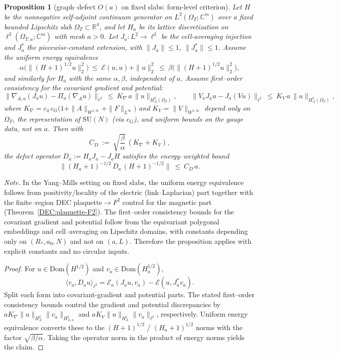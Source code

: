 \documentclass[11pt]{amsart}
\theoremstyle{plain}
\newtheorem{proposition}[theorem]{Proposition}
\theoremstyle{definition}
\theoremstyle{remark}
\renewcommand{\tfrac}[2]{\textstyle\frac{#1}{#2}}
\begin{document}
\begin{proposition}[graph--defect $O(a)$ on fixed slabs: form-level criterion]\label{lem:graph-defect-Oa}
Let $H$ be the nonnegative self-adjoint continuum generator on $L^2(\Omega_T;\mathbb{C}^m)$ over a fixed bounded Lipschitz slab $\Omega_T\subset\mathbb{R}^4$, and let $H_a$ be its lattice discretization on $\ell^2(\Omega_{T,a};\mathbb{C}^m)$ with mesh $a>0$. Let $J_a:L^2\to\ell^2$ be the cell-averaging injection and $J_a^*$ the piecewise-constant extension, with $\|J_a\|\le 1$, $\|J_a^*\|\le 1$. Assume the uniform energy equivalence
\[
\alpha\big(\|(H+1)^{1/2}u\|_2^2\big)\ \le\ \mathcal{E}(u,u)+\|u\|_2^2\ \le\ \beta\big(\|(H+1)^{1/2}u\|_2^2\big),
\]
and similarly for $H_a$ with the same $\alpha,\beta$, independent of $a$. Assume first–order consistency for the covariant gradient and potential:
\[
\big\|\nabla_{A,a}(J_a u)-\Pi_a(\nabla_A u)\big\|_{\ell^2}\ \le\ K_{\nabla}\,a\,\|u\|_{H^{2}_A(\Omega_T)},\qquad
\big\|V_a J_a u- J_a(Vu)\big\|_{\ell^2}\ \le\ K_V\,a\,\|u\|_{H^{1}_A(\Omega_T)},
\]
where $K_{\nabla}=c_4\,c_G\big(1+\|A\|_{W^{1,\infty}}+\|F\|_{L^\infty}\big)$ and $K_V=\|V\|_{W^{1,\infty}}$ depend only on $\Omega_T$, the representation of $\mathrm{SU}(N)$ (via $c_G$), and uniform bounds on the gauge data, not on $a$. Then with
\[
C_D\ :=\ \sqrt{\tfrac{\beta}{\alpha}}\,(K_{\nabla}+K_V),
\]
the defect operator $D_a:=H_a J_a - J_a H$ satisfies the energy–weighted bound
\[
\big\|(H_a+1)^{-1/2}\,D_a\,(H+1)^{-1/2}\big\|\ \le\ C_D\,a.
\]
\end{proposition}
\noindent\emph{Note.} In the Yang--Mills setting on fixed slabs, the uniform energy equivalence follows from positivity/locality of the electric (link--Laplacian) part together with the finite--region DEC plaquette$\to F^2$ control for the magnetic part (Theorem~\ref{DEC:plaquette-F2}). The first--order consistency bounds for the covariant gradient and potential follow from the equivariant polygonal embeddings and cell--averaging on Lipschitz domains, with constants depending only on $(R_*,a_0,N)$ and not on $(a,L)$. Therefore the proposition applies with explicit constants and no circular inputs.

\begin{proof}
For $u\in\mathrm{Dom}(H^{1/2})$ and $v_a\in\mathrm{Dom}(H_a^{1/2})$,
\[
\langle v_a, D_a u\rangle_{\ell^2}
= \mathcal{E}_a(J_a u, v_a) - \mathcal{E}(u, J_a^* v_a).
\]
Split each form into covariant-gradient and potential parts. The stated first–order consistency bounds control the gradient and potential discrepancies by $a K_{\nabla}\|u\|_{H^2_A}\|v_a\|_{H^1_{A,a}}$ and $a K_V\|u\|_{H^1_A}\|v_a\|_{\ell^2}$, respectively. Uniform energy equivalence converts these to the $(H+1)^{1/2}$ / $(H_a+1)^{1/2}$ norms with the factor $\sqrt{\beta/\alpha}$. Taking the operator norm in the product of energy norms yields the claim.
\end{proof}
\end{document}
